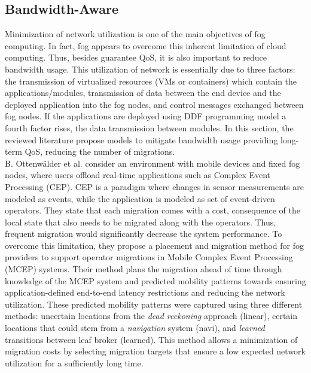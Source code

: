 \subsection{Bandwidth-Aware}\label{sec:bandwidth}
Minimization of network utilization is one of the main objectives of fog computing. In fact, fog appears to overcome this inherent limitation of cloud computing. Thus, besides guarantee QoS, it is also  important to reduce bandwidth usage. This utilization of network is essentially due to three factors: the transmission of virtualized resources (VMs or containers) which contain the applications/modules, transmission of data between the end device and the deployed application into the fog nodes, and control messages exchanged between fog nodes. If the applications are deployed using DDF programming model a fourth factor rises, the data transmission between modules. In this section, the reviewed literature propose models to mitigate bandwidth usage providing long-term QoS, reducing the number of migrations.\\
%
\noindent\tab B. Ottenwälder et al. \cite{ottenwalder2013migcep} consider an environment with mobile devices and fixed fog nodes, where users offload real-time applications such as Complex Event Processing (CEP). CEP is a paradigm where changes in sensor measurements are modeled as events, while the application is modeled as set of event-driven operators. They state that each migration comes with a cost, consequence of the local state that also needs to be migrated along with the operators. Thus, frequent migration would significantly decrease the system performance. To overcome this limitation, they propose a placement and migration method for fog providers to support operator migrations in Mobile Complex Event Processing (MCEP) systems. Their method plans the migration ahead of time through knowledge of the MCEP system and predicted mobility patterns towards ensuring application-defined end-to-end latency restrictions and reducing the network utilization. These predicted mobility patterns were captured using three different methods: uncertain locations from the \textit{dead reckoning} approach (linear), certain locations that could stem from a \textit{navigation} system (navi), and \textit{learned} transitions between leaf broker (learned). This method allows a minimization of migration costs by selecting migration targets that ensure a low expected network utilization for a sufficiently long time.\\ %

